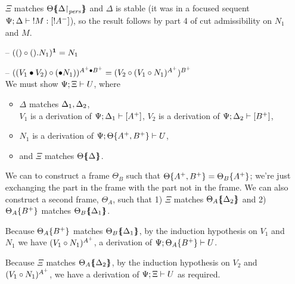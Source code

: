 \begin{itemize}
  $\Xi$ matches ${\Theta}\mbox{$\{\hspace{-4pt}\{$}{\ensuremath{{\Delta}{\upharpoonright}_{{\it pers}}}}\mbox{$\}\hspace{-4pt}\}$}$
  and $\Delta$ is stable (it was in a focused
  sequent ${\Psi}; {\Delta} \vdash {{!}{M}} : {[{!}A^-]}$),
  so the result follows by
  part 4 of cut admissibility on $N_1$ and $M$. 

\smallskip

\item[--] $({()} \circ {().{N}_1})^{\mathbf{1}} = N_1$

\item[--] $({({V_1} \mathbin{\bullet} {V_2})} \circ {({\mathbin{\bullet}}{N_1}}))^{A^+ \mathbin{\bullet} B^+}
           = ({V_2} \circ {({V_1} \circ {N_1})^{A^+}})^{B^+}$ \smallskip\\
  We must show ${\Psi};{\Xi} \vdash {U} \mathstrut$, where
  \begin{itemize}
  \item $\Delta$ matches ${\Delta_1},{\Delta_2}$,\\
        $V_1$ is a derivation of ${\Psi};{\Delta_1} \vdash {[A^+]} \mathstrut$,
        $V_2$ is a derivation of ${\Psi};{\Delta_2} \vdash {[B^+]} \mathstrut$,
  \item $N_1$ is a derivation of 
        ${\Psi};{{\Theta}\{{A^+, B^+}\}} \vdash {U} \mathstrut$, 
  \item and $\Xi$ matches ${\Theta}\mbox{$\{\hspace{-4pt}\{$}{\Delta}\mbox{$\}\hspace{-4pt}\}$}$.
  \end{itemize}

  We can to construct a frame $\Theta_B$ such that
  ${\Theta}\{{{A^+},{B^+}}\} = {\Theta_B}\{{A^+}\}$;
  we're just exchanging
  the part in the frame with the part not in the frame. We can also 
  construct a second frame, $\Theta_A$, such that
  1) $\Xi$ matches ${\Theta_A}\mbox{$\{\hspace{-4pt}\{$}{\Delta_2}\mbox{$\}\hspace{-4pt}\}$}$ and 
  2) ${\Theta_A}\{{B^+}\}$ matches ${\Theta_B}\mbox{$\{\hspace{-4pt}\{$}{\Delta_1}\mbox{$\}\hspace{-4pt}\}$}$.


  Because ${\Theta_A}\{{B^+}\}$ matches ${\Theta_B}\mbox{$\{\hspace{-4pt}\{$}{\Delta_1}\mbox{$\}\hspace{-4pt}\}$}$,
  by the induction hypothesis on $V_1$ and $N_1$ we have
  $({V_1} \circ {N_1})^{A^+}$, a derivation of 
  ${\Psi};{{\Theta_A}\{{B^+}\}} \vdash {U} \mathstrut$.

  Because $\Xi$ matches ${\Theta_A}\mbox{$\{\hspace{-4pt}\{$}{\Delta_2}\mbox{$\}\hspace{-4pt}\}$}$, by the induction
  hypothesis on $V_2$ and $({V_1} \circ {N_1})^{A^+}$, we have a derivation
  of ${\Psi};{\Xi} \vdash {U} \mathstrut$ as required. \smallskip


\end{itemize}
